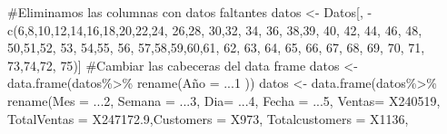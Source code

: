 \documentclass[
  us-letterpaper,
]{scrreprt}
\newenvironment{Shaded}{\begin{snugshade}}{\end{snugshade}}
\newcommand{\AttributeTok}[1]{\textcolor[rgb]{0.40,0.45,0.13}{#1}}
\newcommand{\CommentTok}[1]{\textcolor[rgb]{0.37,0.37,0.37}{#1}}
\newcommand{\DecValTok}[1]{\textcolor[rgb]{0.68,0.00,0.00}{#1}}
\newcommand{\FloatTok}[1]{\textcolor[rgb]{0.68,0.00,0.00}{#1}}
\newcommand{\FunctionTok}[1]{\textcolor[rgb]{0.28,0.35,0.67}{#1}}
\newcommand{\NormalTok}[1]{\textcolor[rgb]{0.00,0.23,0.31}{#1}}
\newcommand{\OtherTok}[1]{\textcolor[rgb]{0.00,0.23,0.31}{#1}}
\newcommand{\SpecialCharTok}[1]{\textcolor[rgb]{0.37,0.37,0.37}{#1}}
\theoremstyle{plain}
\theoremstyle{plain}
\theoremstyle{definition}
\theoremstyle{remark}
\begin{document}
\begin{Shaded}
\begin{Highlighting}[]
\CommentTok{\#Eliminamos las columnas con datos faltantes}
\NormalTok{datos }\OtherTok{\textless{}{-}}\NormalTok{ Datos[, }\SpecialCharTok{{-}}\FunctionTok{c}\NormalTok{(}\DecValTok{6}\NormalTok{,}\DecValTok{8}\NormalTok{,}\DecValTok{10}\NormalTok{,}\DecValTok{12}\NormalTok{,}\DecValTok{14}\NormalTok{,}\DecValTok{16}\NormalTok{,}\DecValTok{18}\NormalTok{,}\DecValTok{20}\NormalTok{,}\DecValTok{22}\NormalTok{,}\DecValTok{24}\NormalTok{, }\DecValTok{26}\NormalTok{,}\DecValTok{28}\NormalTok{, }\DecValTok{30}\NormalTok{,}\DecValTok{32}\NormalTok{, }\DecValTok{34}\NormalTok{, }\DecValTok{36}\NormalTok{,}
                    \DecValTok{38}\NormalTok{,}\DecValTok{39}\NormalTok{, }\DecValTok{40}\NormalTok{,  }\DecValTok{42}\NormalTok{, }\DecValTok{44}\NormalTok{, }\DecValTok{46}\NormalTok{, }\DecValTok{48}\NormalTok{, }\DecValTok{50}\NormalTok{,}\DecValTok{51}\NormalTok{,}\DecValTok{52}\NormalTok{, }\DecValTok{53}\NormalTok{, }\DecValTok{54}\NormalTok{,}\DecValTok{55}\NormalTok{, }\DecValTok{56}\NormalTok{, }
\DecValTok{57}\NormalTok{,}\DecValTok{58}\NormalTok{,}\DecValTok{59}\NormalTok{,}\DecValTok{60}\NormalTok{,}\DecValTok{61}\NormalTok{, }\DecValTok{62}\NormalTok{, }\DecValTok{63}\NormalTok{, }\DecValTok{64}\NormalTok{, }\DecValTok{65}\NormalTok{, }\DecValTok{66}\NormalTok{, }\DecValTok{67}\NormalTok{, }\DecValTok{68}\NormalTok{, }\DecValTok{69}\NormalTok{, }\DecValTok{70}\NormalTok{, }\DecValTok{71}\NormalTok{, }\DecValTok{73}\NormalTok{,}\DecValTok{74}\NormalTok{,}\DecValTok{72}\NormalTok{, }\DecValTok{75}\NormalTok{)]}
\CommentTok{\#Cambiar las cabeceras del data frame  }
\NormalTok{datos }\OtherTok{\textless{}{-}} \FunctionTok{data.frame}\NormalTok{(datos}\SpecialCharTok{\%\textgreater{}\%} \FunctionTok{rename}\NormalTok{(Año }\OtherTok{=}\NormalTok{ ...}\DecValTok{1}\NormalTok{ ))}
\NormalTok{datos }\OtherTok{\textless{}{-}} \FunctionTok{data.frame}\NormalTok{(datos}\SpecialCharTok{\%\textgreater{}\%} \FunctionTok{rename}\NormalTok{(}\AttributeTok{Mes =}\NormalTok{ ...}\DecValTok{2}\NormalTok{, }\AttributeTok{Semana =}\NormalTok{ ...}\DecValTok{3}\NormalTok{, }\AttributeTok{Dia=}\NormalTok{ ...}\DecValTok{4}\NormalTok{, }
                  \AttributeTok{Fecha =}\NormalTok{ ...}\DecValTok{5}\NormalTok{, }\AttributeTok{Ventas=}\NormalTok{ X240519, }
                  \AttributeTok{TotalVentas =}\NormalTok{ X247172}\FloatTok{.9}\NormalTok{,}\AttributeTok{Customers =}\NormalTok{ X973,}
                  \AttributeTok{Totalcustomers =}\NormalTok{ X1136, }

\end{Highlighting}
\end{Shaded}
\end{document}
